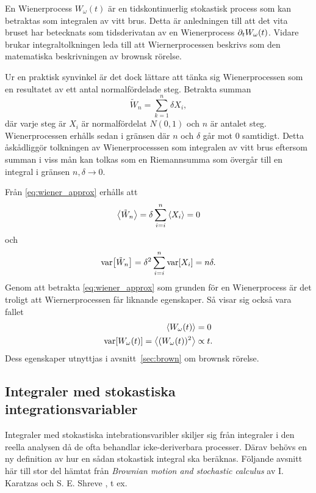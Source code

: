 En Wienerprocess $W_\omega(t)$ är en tidskontinuerlig stokastisk process som kan betraktas som integralen av vitt brus\cite{Miller_probability2012}. Detta är anledningen till att det vita bruset har betecknats som tidsderivatan av en Wienerprocess $\partial_tW_\omega(t)$. Vidare brukar integraltolkningen leda till att Wiernerprocessen beskrivs som den matematiska beskrivningen av brownsk rörelse. 

Ur en praktisk synvinkel är det dock lättare att tänka sig Wienerprocessen som en resultatet av ett antal normalfördelade steg. Betrakta summan
\begin{equation}\label{eq:wiener_approx}
\tilde{W}_n = \sum_{k=1}^{n} \delta X_i,
\end{equation}
där varje steg är $X_i$ är normalfördelat $N(0,1)$ och $n$ är antalet steg. 
Wienerprocessen erhålls sedan i gränsen där $n$ och $\delta$ går mot $0$ samtidigt\cite{Miller_probability2012}. Detta åskådliggör tolkningen av Wienerprocesssen som integralen av vitt brus eftersom summan i viss mån kan tolkas som en Riemannsumma som övergår till en integral i gränsen $n, \delta \to 0$.

Från \eqref{eq:wiener_approx} erhålls att 
\begin{equation}
\ev{\tilde{W}_n} = \delta \sum_{i=i}^n \ev{X_i} = 0
\end{equation}
och
\begin{equation}
\text{var}\!\left[\tilde{W}_n\right] = \delta^2 \sum_{i=i}^n \text{var}\!\left[X_i\right] = n\delta.
\end{equation}
Genom att betrakta \eqref{eq:wiener_approx} som grunden för en Wienerprocess är det troligt att Wiernerprocessen får liknande egenskaper. Så visar sig också vara fallet~\cite{Miller_probability2012}
\begin{equation}
\begin{aligned}
\ev{W_\omega(t)} &= 0\\
\VAR{ W_\omega(t) } = \ev{ (W_\omega(t))^2 } &\propto t.
\end{aligned}
\end{equation}
Dess egenskaper utnyttjas i avsnitt~\ref{sec:brown} om brownsk rörelse.


\subsection{Integraler med stokastiska integrationsvariabler}
\label{sec:Stok_int}

Integraler med stokastiska intebrationsvaribler skiljer sig från integraler i den reella analysen då de ofta behandlar icke-deriverbara processer. Därav behövs en ny definition av hur en sådan stokastisk integral ska beräknas. Följande avsnitt här till stor del hämtat från \textit{Brownian motion and stochastic calculus} av I. Karatzas och S. E. Shreve \cite{Karatzas_stokint1991}, t ex.

